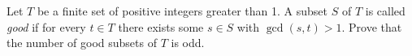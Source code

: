 Let $T$ be a finite set of positive integers greater than 1. A subset $S$ of $T$ is called \emph{good} if for every $t \in T$ there exists some $s \in S$ with $\gcd(s, t) > 1$. Prove that the number of good subsets of $T$ is odd.